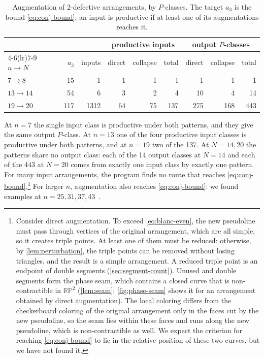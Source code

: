 \begin{table}[tb]
\centering
\caption{Augmentation of 2-defective arrangements, by $P$-classes. The target $a_3$ is the bound \eqref{eq:conj-bound}; an input is productive if at least one of its augmentations reaches it.}
\label{tab:augmentation}
\begin{tabular}{lrrrrrrrr}
\toprule
 & & & \multicolumn{3}{c}{productive inputs} & \multicolumn{3}{c}{output $P$-classes} \\
\cmidrule(lr){4-6}\cmidrule(lr){7-9}
$n\to N$ & $a_3$ & inputs & direct & collapse & total & direct & collapse & total \\
\midrule
$7\to8$   & 15  & 1    & 1  & 1  & 1   & 1   & 1   & 1   \\
$13\to14$ & 54  & 6    & 3  & 2  & 4   & 10  & 4   & 14  \\
$19\to20$ & 117 & 1312 & 64 & 75 & 137 & 275 & 168 & 443 \\
\bottomrule
\end{tabular}
\end{table}

At $n=7$ the single input class is productive under both patterns, and they give the same output $P$-class.
At $n=13$ one of the four productive input classes is productive under both patterns, and at $n=19$ two of the 137.
At $N=14,20$ the patterns share no output class: each of the 14 output classes at $N=14$ and each of the 443 at $N=20$ comes from exactly one input class by exactly one pattern.
For many input arrangements, the program finds no route that reaches \eqref{eq:conj-bound}.\footnote{Consider direct augmentation.
To exceed \eqref{eq:blanc-even}, the new pseudoline must pass through vertices of the original arrangement, which are all simple, so it creates triple points.
At least one of them must be reduced: otherwise, by \cref{lem:perturbation}, the triple points can be removed without losing triangles, and the result is a simple arrangement.
A reduced triple point is an endpoint of double segments (\cref{sec:segment-count}). Unused and double segments form the phase seam, which contains a closed curve that is non-contractible in $\mathbb{RP}^2$ (\cref{lem:seam}; \cref{fig:phase-seam} shows it for an arrangement obtained by direct augmentation).
The local coloring differs from the checkerboard coloring of the original arrangement only in the faces cut by the new pseudoline, so the seam lies within these faces and runs along the new pseudoline, which is non-contractible as well.
We expect the criterion for reaching \eqref{eq:conj-bound} to lie in the relative position of these two curves, but we have not found it.}
For larger $n$, augmentation also reaches \eqref{eq:conj-bound}: we found examples at $n=25,31,37,43$~\cite{nonsimple-arrangements}.

